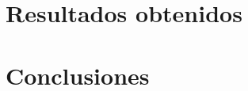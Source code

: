 \documentclass[a4paper]{article}
\begin{document}
 

\section{Resultados obtenidos}

\section{Conclusiones}
\end{document}

